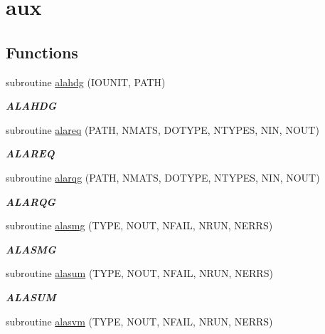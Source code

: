 \hypertarget{group__aux__eig}{}\section{aux}
\label{group__aux__eig}
\subsection*{Functions}
\begin{DoxyCompactItemize}
\item 
subroutine \hyperlink{group__aux__eig_gad1fc479bdf1b02f3844d630fa505e814}{alahdg} (I\+O\+U\+N\+I\+T, P\+A\+T\+H)
\begin{DoxyCompactList}\small\item\em {\bfseries A\+L\+A\+H\+D\+G} \end{DoxyCompactList}\item 
subroutine \hyperlink{group__aux__eig_ga0700b15ddc94106ea2d9fe4c97f8cdeb}{alareq} (P\+A\+T\+H, N\+M\+A\+T\+S, D\+O\+T\+Y\+P\+E, N\+T\+Y\+P\+E\+S, N\+I\+N, N\+O\+U\+T)
\begin{DoxyCompactList}\small\item\em {\bfseries A\+L\+A\+R\+E\+Q} \end{DoxyCompactList}\item 
subroutine \hyperlink{group__aux__eig_ga8879a2d8dc2e86afd6b7e2269b7219ed}{alarqg} (P\+A\+T\+H, N\+M\+A\+T\+S, D\+O\+T\+Y\+P\+E, N\+T\+Y\+P\+E\+S, N\+I\+N, N\+O\+U\+T)
\begin{DoxyCompactList}\small\item\em {\bfseries A\+L\+A\+R\+Q\+G} \end{DoxyCompactList}\item 
subroutine \hyperlink{group__aux__eig_ga09ab1f017a25bb3acfed18a650325888}{alasmg} (T\+Y\+P\+E, N\+O\+U\+T, N\+F\+A\+I\+L, N\+R\+U\+N, N\+E\+R\+R\+S)
\begin{DoxyCompactList}\small\item\em {\bfseries A\+L\+A\+S\+M\+G} \end{DoxyCompactList}\item 
subroutine \hyperlink{group__aux__eig_gad56ccbe8939c1230b917e03bf7b722b7}{alasum} (T\+Y\+P\+E, N\+O\+U\+T, N\+F\+A\+I\+L, N\+R\+U\+N, N\+E\+R\+R\+S)
\begin{DoxyCompactList}\small\item\em {\bfseries A\+L\+A\+S\+U\+M} \end{DoxyCompactList}\item 
subroutine \hyperlink{group__aux__eig_gad0cdc70e35bb8b07b0e95688e8d2123f}{alasvm} (T\+Y\+P\+E, N\+O\+U\+T, N\+F\+A\+I\+L, N\+R\+U\+N, N\+E\+R\+R\+S)

\end{DoxyCompactItemize}
